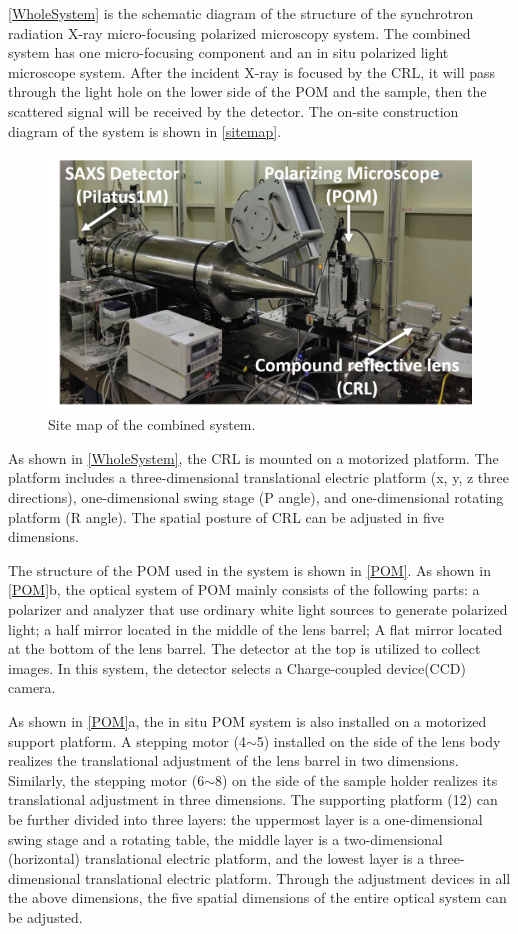 \documentclass{Head}
\begin{document}
\autoref{WholeSystem} is the schematic diagram of the structure of the synchrotron radiation X-ray micro-focusing polarized microscopy system.
The combined system has one micro-focusing component and an in situ polarized light microscope system.
After the incident X-ray is focused by the CRL, it will pass through the light hole on the lower side of the POM and the sample, then the scattered signal will be received by the detector.
The on-site construction diagram of the system is shown in \autoref{sitemap}.
\begin{figure}
    \centering
    \includegraphics[scale=0.5]{Figures/Fig4SiteMap.png}
    \caption{Site map of the combined system.}
    \label{sitemap}
\end{figure}

As shown in \autoref{WholeSystem}, the CRL is mounted on a motorized platform. The platform includes a three-dimensional translational electric platform (x, y, z three directions), one-dimensional swing stage (P angle), and one-dimensional rotating platform (R angle). The spatial posture of CRL can be adjusted in five dimensions.


The structure of the POM used in the system is shown in \autoref{POM}.
As shown in \autoref{POM}b, the optical system of POM mainly consists of the following parts: a polarizer and analyzer that use ordinary white light sources to generate polarized light; a half mirror located in the middle of the lens barrel; A flat mirror located at the bottom of the lens barrel. The detector at the top is utilized to collect images. In this system, the detector selects a Charge-coupled device(CCD) camera.


As shown in \autoref{POM}a, the in situ POM system is also installed on a motorized support platform.
A stepping motor (4$\sim$5) installed on the side of the lens body realizes the translational adjustment of the lens barrel in two dimensions.
Similarly, the stepping motor (6$\sim$8) on the side of the sample holder realizes its translational adjustment in three dimensions.
The supporting platform (12) can be further divided into three layers: the uppermost layer is a one-dimensional swing stage and a rotating table, the middle layer is a two-dimensional (horizontal) translational electric platform, and the lowest layer is a three-dimensional translational electric platform.
Through the adjustment devices in all the above dimensions, the five spatial dimensions of the entire optical system can be adjusted.
\end{document}
